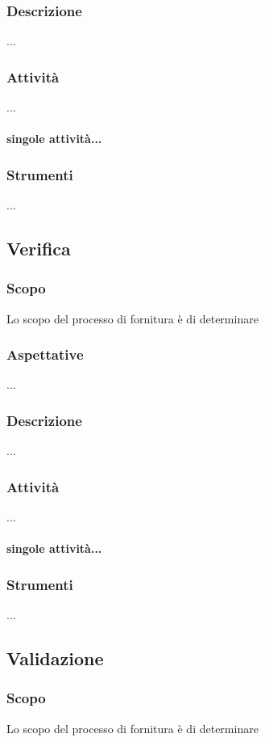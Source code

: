     \subsubsection{Descrizione}
    ...
    \subsubsection{Attività}
    ...
    \paragraph{singole attività...}
    \subsubsection{Strumenti}
    ...

\subsection{Verifica}
\label{verifica}
    \subsubsection{Scopo}
    Lo scopo del processo di fornitura è di determinare
    \subsubsection{Aspettative}
    ...
    \subsubsection{Descrizione}
    ...
    \subsubsection{Attività}
    ...
    \paragraph{singole attività...}
    \subsubsection{Strumenti}
    ...

\subsection{Validazione}
    \subsubsection{Scopo}
    Lo scopo del processo di fornitura è di determinare
